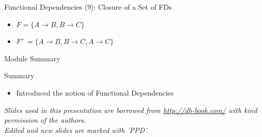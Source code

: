 \documentclass[aspectratio=169, xcolor=dvipsnames]{beamer}
\begin{document}
\begin{frame}{Functional Dependencies (9): Closure of a Set of FDs}
    \begin{itemize}[<+->]
        \item $F = \{A \rightarrow B, B \rightarrow C\}$
        \item $F^+ = \{A \rightarrow B, B \rightarrow C, A \rightarrow C\}$
    \end{itemize}
\end{frame}

\begin{frame}{Module Summary}
    \begin{block}{Summary}
        \begin{itemize}[<+->]
            \item Introduced the notion of Functional Dependencies
        \end{itemize}
    \end{block}
    \vspace{2em}
    \begin{center}
    \small \textit{Slides used in this presentation are borrowed from \url{http://db-book.com/} with kind permission of the authors.} \\
    \small \textit{Edited and new slides are marked with 'PPD'.}
    \end{center}
\end{frame}
\end{document}

